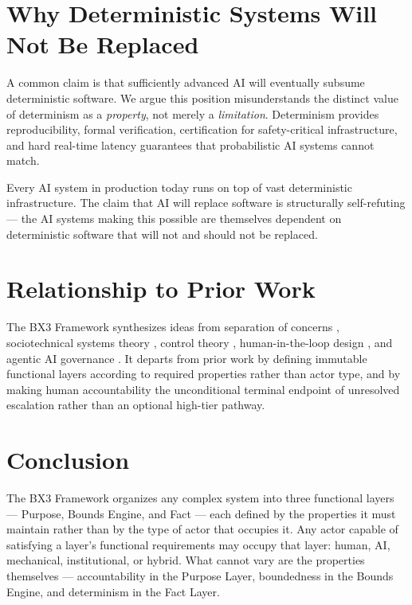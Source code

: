 \documentclass[12pt]{article}
\begin{document}
\section{Why Deterministic Systems Will Not Be Replaced}
\label{sec:determinism}

A common claim is that sufficiently advanced AI will eventually subsume deterministic software. We argue this position misunderstands the distinct value of determinism as a \textit{property}, not merely a \textit{limitation}. Determinism provides reproducibility, formal verification, certification for safety-critical infrastructure, and hard real-time latency guarantees that probabilistic AI systems cannot match.

Every AI system in production today runs on top of vast deterministic infrastructure. The claim that AI will replace software is structurally self-refuting --- the AI systems making this possible are themselves dependent on deterministic software that will not and should not be replaced.

\section{Relationship to Prior Work}
\label{sec:prior}

The BX3 Framework synthesizes ideas from separation of concerns \cite{dijkstra1982}, sociotechnical systems theory \cite{trist1981}, control theory \cite{wiener1948}, human-in-the-loop design \cite{bansal2019}, and agentic AI governance \cite{kim2025tao,koch2026,alenezi2026}. It departs from prior work by defining immutable functional layers according to required properties rather than actor type, and by making human accountability the unconditional terminal endpoint of unresolved escalation rather than an optional high-tier pathway.

\section{Conclusion}
\label{sec:conclusion}

The BX3 Framework organizes any complex system into three functional layers --- Purpose, Bounds Engine, and Fact --- each defined by the properties it must maintain rather than by the type of actor that occupies it. Any actor capable of satisfying a layer's functional requirements may occupy that layer: human, AI, mechanical, institutional, or hybrid. What cannot vary are the properties themselves --- accountability in the Purpose Layer, boundedness in the Bounds Engine, and determinism in the Fact Layer.
\end{document}
